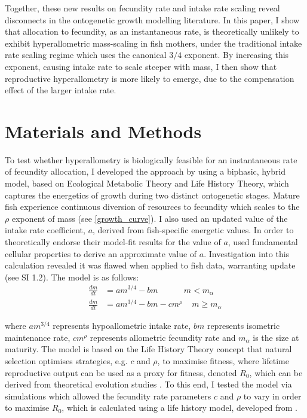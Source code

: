 \documentclass[a4paper]{article} %
\begin{document}
    Together, these new results on fecundity rate and intake rate scaling reveal disconnects in the ontogenetic growth modelling literature. In this paper, I show that allocation to fecundity, as an instantaneous rate, is theoretically unlikely to exhibit hyperallometric mass-scaling in fish mothers, under the traditional intake rate scaling regime which uses the canonical $3/4$ exponent. By increasing this exponent, causing intake rate to scale steeper with mass, I then show that reproductive hyperallometry is more likely to emerge, due to the compensation effect of the larger intake rate.
\section{Materials and Methods}\thispagestyle{plain}

To test whether hyperallometry is biologically feasible for an instantaneous rate of fecundity allocation, I developed the \textcite{Charnov2001} approach by using a biphasic, hybrid model, based on Ecological Metabolic Theory and Life History Theory, which captures the energetics of growth during two distinct ontogenetic stages. Mature fish experience continuous diversion of resources to fecundity which scales to the $\rho$ exponent of mass (see \cref{growth_curve}). I also used an updated value of the intake rate coefficient, $a$, derived from fish-specific energetic values. In order to theoretically endorse their model-fit results for the value of $a$, \textcite{West2001} used fundamental cellular properties to derive an approximate value of $a$. Investigation into this calculation revealed it was flawed when applied to fish data, warranting update (see SI 1.2). The model is as follows:
\begin{align}
    \frac{dm}{dt} &= am^{3/4} - bm \ \ \ \ \ \ \ \ \ \ \ \ \ \ m < m_{\alpha} \label{luke_model_juvenile}\\
    \frac{dm}{dt} &= am^{3/4} - bm - cm^{\rho} \ \ \ \ \ m \geq m_{\alpha} \label{luke_model}
\end{align}

where $am^{3/4}$ represents hypoallometric intake rate, $bm$ represents isometric maintenance rate, $cm^{\rho}$ represents allometric fecundity rate and $m_{\alpha}$ is the size at maturity. The model is based on the Life History Theory concept that natural selection optimises strategies, e.g. $c$ and $\rho$, to maximise fitness, where lifetime reproductive output can be used as a proxy for fitness, denoted $R_0$, which can be derived from theoretical evolution studies \autocite{Charnov2001, stearns1992evolution}. To this end, I tested the model via simulations which allowed the fecundity rate parameters $c$ and $\rho$ to vary in order to maximise $R_0$, which is calculated using a life history model, developed from \textcite{Charnov2001}.
\end{document}
